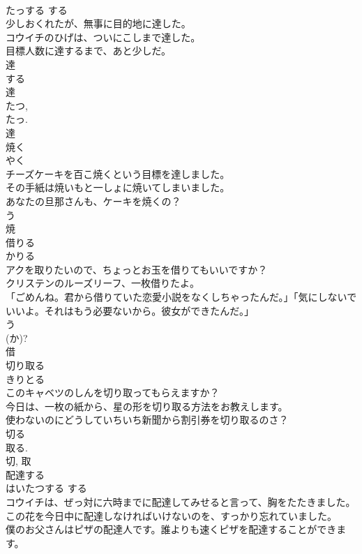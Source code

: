 \documentclass[8pt]{extreport}
\begin{document}
\begin{CJK}{UTF8}{min}
\\	たっする	する 
\\	少しおくれたが、無事に目的地に達した。	
\\	コウイチのひげは、ついにこしまで達した。	
\\	目標人数に達するまで、あと少しだ。	
\\	達 
\\	する 
\\	達 
\\	たつ, 
\\	たっ. 
\\	達	
\\	焼く	
\\	やく	
\\	チーズケーキを百こ焼くという目標を達しました。	
\\	その手紙は焼いもと一しょに焼いてしまいました。	
\\	あなたの旦那さんも、ケーキを焼くの？	
\\	う 
\\	焼	
\\	借りる	
\\	かりる	
\\	アクを取りたいので、ちょっとお玉を借りてもいいですか？	
\\	クリステンのルーズリーフ、一枚借りたよ。	
\\	「ごめんね。君から借りていた恋愛小説をなくしちゃったんだ。」「気にしないでいいよ。それはもう必要ないから。彼女ができたんだ。」	
\\	う 
\\	(か)? 
\\	借	
\\	切り取る	
\\	きりとる	
\\	このキャベツのしんを切り取ってもらえますか？	
\\	今日は、一枚の紙から、星の形を切り取る方法をお教えします。	
\\	使わないのにどうしていちいち新聞から割引券を切り取るのさ？	
\\	切る 
\\	取る. 
\\	切, 取	
\\	配達する	
\\	はいたつする	する 
\\	コウイチは、ぜっ対に六時までに配達してみせると言って、胸をたたきました。	
\\	この花を今日中に配達しなければいけないのを、すっかり忘れていました。	
\\	僕のお父さんはピザの配達人です。誰よりも速くピザを配達することができます。	

\end{CJK}
\end{document}
